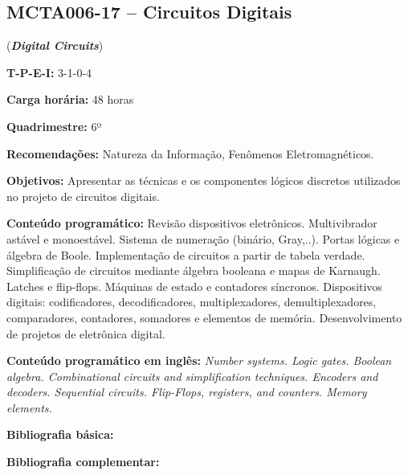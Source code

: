\documentclass[class=article, crop=false]{standalone}
\begin{document}
\subsection*{MCTA006-17 -- Circuitos Digitais}
\label{disc:circ_dig}

(\textbf{\textit{Digital Circuits}})

\begin{center}
    \begin{minipage}{0.85\textwidth}
        \textbf{T-P-E-I:} 3-1-0-4
        
        \textbf{Carga horária:} 48 horas
        
        \textbf{Quadrimestre:} 6º
        
        \textbf{Recomendações:} 
        Natureza da Informação, 
        Fenômenos Eletromagnéticos.
    \end{minipage}
\end{center}

\textbf{Objetivos:}
Apresentar as técnicas e os componentes lógicos discretos utilizados no projeto
de circuitos digitais.

\textbf{Conteúdo programático:}
Revisão dispositivos eletrônicos. 
Multivibrador astável e monoestável. 
Sistema de numeração (binário, Gray,..). 
Portas lógicas e álgebra de Boole. 
Implementação de circuitos a partir de tabela verdade. 
Simplificação de circuitos mediante álgebra booleana e mapas de Karnaugh. 
Latches e flip-flops. 
Máquinas de estado e contadores síncronos. 
Dispositivos digitais: codificadores, decodificadores, multiplexadores,
demultiplexadores, comparadores, contadores, somadores e elementos de memória.
Desenvolvimento de projetos de eletrônica digital.

\textbf{Conteúdo programático em inglês:}
\textit{Number systems. 
Logic gates. 
Boolean algebra. 
Combinational circuits and simplification techniques. 
Encoders and decoders. 
Sequential circuits. 
Flip-Flops, registers, and counters. 
Memory elements.}

\newrefsection
\textbf{Bibliografia básica:}
\nocite{2007-floyd, 2007-tocci, 2008-vahid}
\printbibliography

\newrefsection
\textbf{Bibliografia complementar:}
\nocite{2000-ercegovac, 2006-idoeta, 2005-katz, 2006-wakerly, 2005-agarwal}
\printbibliography
\end{document}
